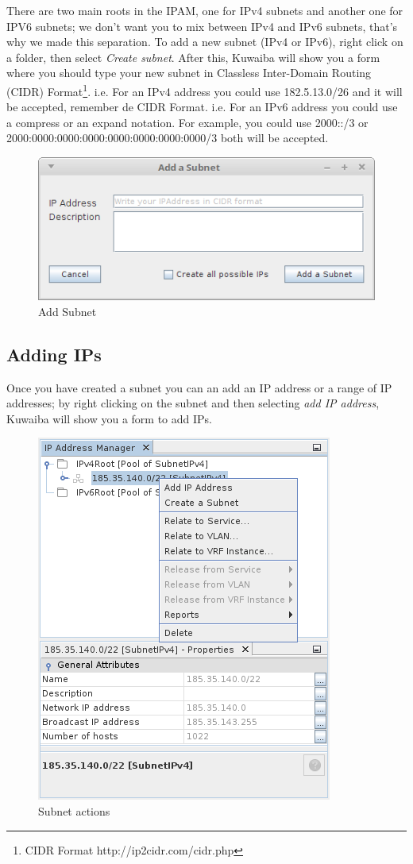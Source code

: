 \documentclass[a4paper]{article}
\begin{document}
		There are two main roots in the IPAM, one for IPv4 subnets and another one for IPV6 subnets; we don't want you to mix between IPv4 and IPv6 subnets, that's why we made this separation.  To add a new subnet (IPv4 or IPv6), right click on a folder, then select \textit{Create subnet}. After this, Kuwaiba will show you a form where you should type your new subnet in Classless Inter-Domain Routing (CIDR) Format\footnote{CIDR Format http://ip2cidr.com/cidr.php}.
		\newline i.e. For an IPv4 address you could use 182.5.13.0/26 and it will be accepted, remember de CIDR Format. 
		\newline i.e. For an IPv6 address you could use a compress or an expand notation. For example, you could use 2000::/3 or 2000:0000:0000:0000:0000:0000:0000:0000/3 both will be accepted.
		\begin{figure}[h!]
			\centering
			\includegraphics[width=0.5\linewidth]{img/ipam_add_subnet.png}
			\caption{Add Subnet}
			\label{fig:ipam_add_subnet}
		\end{figure}
		
		\subsection{Adding IPs}
		
		Once you have created a subnet you can an add an IP address or a range of IP addresses; by right clicking on the subnet and then selecting \textit{add IP address}, Kuwaiba will show you a form to add IPs.
		\begin{figure}[h!]
			\centering
			\includegraphics[width=0.4\linewidth]{img/ipam_subnet_actions.png}
			\caption{Subnet actions}
			\label{fig:ipam_subnet_actions}
		\end{figure}
		
\end{document}
